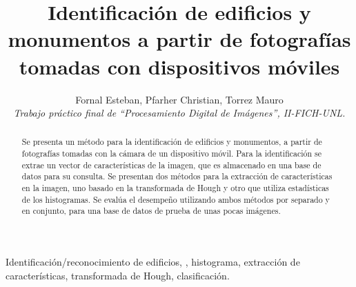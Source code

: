\documentclass[conference,spanish,a4paper,10pt,oneside,final]{tfmpd}
\begin{document}
\title{Identificación de edificios y monumentos a partir de fotografías
tomadas con dispositivos móviles}
\author{Fornal Esteban, Pfarher Christian, Torrez Mauro\\
\textit{Trabajo práctico final de ``Procesamiento Digital de
Imágenes'', II-FICH-UNL.}}
\maketitle
%
%
%
%
\begin{abstract}
Se presenta un método para la identificación de edificios y monumentos, a
partir de fotografías tomadas con la cámara de un dispositivo móvil.
Para la identificación se extrae un vector de características de la imagen,
que es almacenado en una base de datos para su consulta.
Se presentan dos métodos para la extracción de características en la imagen, uno
basado en la transformada de Hough y otro que utiliza estadísticas de los
histogramas. Se evalúa el desempeño utilizando ambos métodos por separado y en
conjunto, para una base de datos de prueba de unas pocas imágenes.
\end{abstract}
%
%
%
%
\begin{keywords}
Identificación/reconocimiento de edificios, ,
histograma, extracción de características, transformada de Hough, clasificación.
\end{keywords}
\nocite{*}


\end{document}
